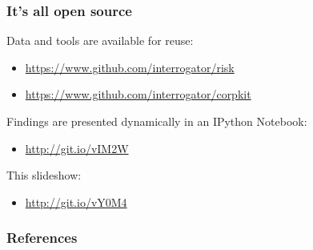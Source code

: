 \documentclass{beamer}       %
\begin{document}
\begin{frame}
    \frametitle{It's all open source}
    Data and tools are available for reuse:
    \begin{itemize}
    \item \url{https://www.github.com/interrogator/risk}
    \item \url{https://www.github.com/interrogator/corpkit}
    \end{itemize}
    Findings are presented dynamically in an IPython Notebook: 
    \begin{itemize}
    \item \url{http://git.io/vIM2W}
    \end{itemize}
    This slideshow:
    \begin{itemize}
    \item \url{http://git.io/vY0M4}
    \end{itemize}
\end{frame}

    \begin{frame}[t,allowframebreaks]
    \frametitle{References}
    
    
    \end{frame}
    
    
\end{document}
